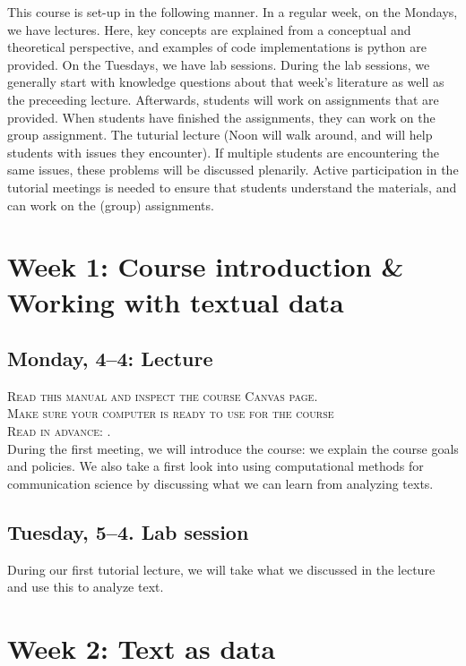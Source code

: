 This course is set-up in the following manner. In a regular week, on the Mondays, we have lectures. Here, key concepts are explained from a conceptual and theoretical perspective, and examples of code implementations is python are provided.  On the Tuesdays, we have lab sessions. During the lab sessions, we generally start with knowledge questions about that week's literature as well as the preceeding lecture. Afterwards, students will work on assignments that are provided. When students have finished the assignments, they can work on the group assignment. The tuturial lecture (Noon will walk around, and will help students with issues they encounter). If multiple students are encountering the same issues, these problems will be discussed plenarily. Active participation in the tutorial meetings is needed to ensure that students understand the materials, and can work on the (group) assignments.

\section*{Week 1: Course introduction \& Working with textual data}

\subsection*{Monday, 4--4: Lecture}
\textsc{ Read this manual and inspect the course Canvas page.}\\
\textsc{ Make sure your computer is ready to use for the course }\\
\textsc{ Read in advance: \cite{Hirschenberg2015}.} \\
During the first meeting, we will introduce the course: we explain the course goals and policies. We also take a first look into using computational methods for communication science by discussing what we can learn from analyzing texts.


\subsection*{Tuesday, 5--4. Lab session}
During our first tutorial lecture, we will take what we discussed in the lecture and use this to analyze text.

\section*{Week 2: Text as data}

